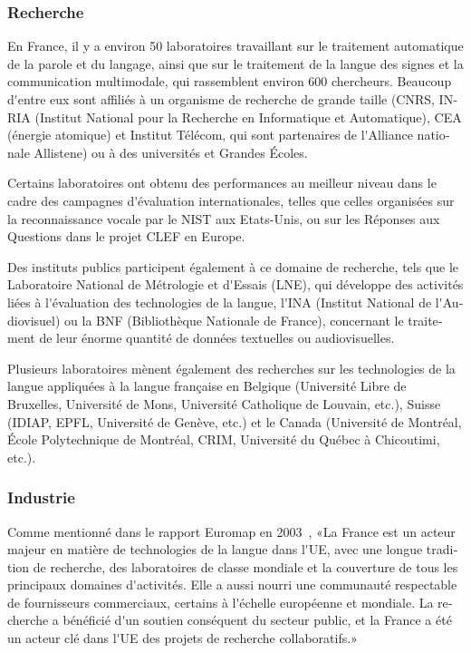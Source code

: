 \begin{french}
\begin{multicols}{2}
\subsubsection{Recherche}

En France, il y a environ 50 laboratoires travaillant sur le traitement
automatique de la parole et du langage, ainsi que sur le traitement de
la langue des signes et la communication multimodale, qui
rassemblent environ 600 chercheurs. Beaucoup d{\mbox '}entre eux sont affiliés
à un organisme de recherche de grande taille (CNRS, INRIA (Institut
National pour la Recherche en Informatique et Automatique), CEA
(énergie atomique) et Institut Télécom, qui sont partenaires de
l{\mbox '}Alliance nationale Allistene) ou à des universités et Grandes Écoles.

Certains laboratoires ont obtenu des performances au meilleur niveau
dans le cadre des campagnes d{\mbox '}évaluation internationales, telles que
celles organisées sur la reconnaissance vocale par le NIST aux
Etats-Unis, ou sur les Réponses aux Questions dans le projet CLEF en
Europe.

Des instituts publics participent également à ce domaine de
recherche, tels que le Laboratoire National de Métrologie et d{\mbox '}Essais
(LNE), qui développe des activités liées à l{\mbox '}évaluation des
technologies de la langue, l{\mbox '}INA (Institut National de l{\mbox '}Audiovisuel)
ou la BNF (Bibliothèque Nationale de France), concernant le traitement
de leur énorme quantité de données textuelles ou audiovisuelles.

Plusieurs laboratoires mènent également des recherches sur les
technologies de la langue appliquées à la langue française en Belgique
(Université Libre de Bruxelles, Université de Mons, Université
Catholique de Louvain, etc.), Suisse (IDIAP, EPFL, Université de
Genève, etc.) et le Canada (Université de Montréal, École
Polytechnique de Montréal, CRIM, Université du Québec à Chicoutimi,
etc.).

\subsubsection{Industrie}

Comme mentionné dans le rapport Euromap en 2003~\cite{euromap}, «La
France est un acteur majeur en matière de technologies de la langue
dans l{\mbox '}UE, avec une longue tradition de recherche, des laboratoires de
classe mondiale et la couverture de tous les principaux domaines
d{\mbox '}activités. Elle a aussi nourri une communauté respectable de
fournisseurs commerciaux, certains à l{\mbox '}échelle européenne et
mondiale. La recherche a bénéficié d{\mbox '}un soutien conséquent du secteur
public, et la France a été un acteur clé dans l{\mbox '}UE des projets de
recherche collaboratifs.»


\end{multicols}
\end{french}
